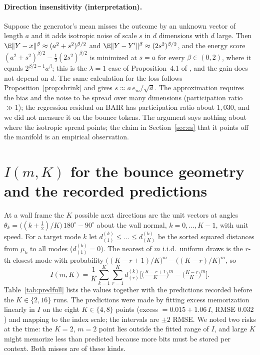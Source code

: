 \paragraph{Direction insensitivity (interpretation).}
Suppose the generator's mean misses the outcome by an unknown vector of length $a$ and it adds isotropic noise of scale $s$ in $d$ dimensions with $d$ large. Then $\E\|Y - x\|^\beta \approx (a^2 + s^2)^{\beta/2}$ and $\E\|Y - Y'\|^\beta \approx (2 s^2)^{\beta/2}$, and the energy score $(a^2 + s^2)^{\beta/2} - \frac{1}{2}(2s^2)^{\beta/2}$ is minimized at $s = a$ for every $\beta \in (0, 2)$, where it equals $2^{\beta/2 - 1} a^\beta$; this is the $\lambda = 1$ case of Proposition~4.1 of \citet{debortoli2025distributional}, and the gain does not depend on $d$. The same calculation for the \nom{} loss follows Proposition~\ref{prop:shrink} and gives $s \approx a\, e_m/\sqrt{d}$. The approximation requires the bias and the noise to be spread over many dimensions (participation ratio $\gg 1$); the regression residual on BAIR has participation ratio about $1{,}030$, and we did not measure it on the bounce tokens. The argument says nothing about where the isotropic spread points; the claim in Section~\ref{sec:es} that it points off the manifold is an empirical observation.

\section{$I(m,K)$ for the bounce geometry and the recorded predictions}
\label{app:pred}
\label{app:imk}
At a wall frame the $K$ possible next directions are the unit vectors at angles $\theta_k = \big((k + \tfrac12)/K\big)\,180^\circ - 90^\circ$ about the wall normal, $k = 0, \dots, K-1$, with unit speed. For a target mode $k$ let $d^{(k)}_{(1)} \le \dots \le d^{(k)}_{(K)}$ be the sorted squared distances from $\mu_k$ to all modes ($d^{(k)}_{(1)} = 0$). The nearest of $m$ i.i.d.\ uniform draws is the $r$-th closest mode with probability $\big((K - r + 1)/K\big)^m - \big((K - r)/K\big)^m$, so
\begin{equation}
I(m, K) = \frac{1}{K} \sum_{k=1}^{K} \sum_{r=1}^{K} d^{(k)}_{(r)} \Big[ \big(\tfrac{K - r + 1}{K}\big)^m - \big(\tfrac{K - r}{K}\big)^m \Big].
\end{equation}
Table~\ref{tab:predfull} lists the values together with the predictions recorded before the $K \in \{2, 16\}$ runs. The predictions were made by fitting excess memorization linearly in $I$ on the eight $K \in \{4, 8\}$ points (excess $= 0.015 + 1.06\,I$, RMSE $0.032$) and mapping to the index scale; the intervals are $\pm 2$ RMSE. We noted two risks at the time: the $K{=}2$, $m{=}2$ point lies outside the fitted range of $I$, and large $K$ might memorize less than predicted because more bits must be stored per context. Both misses are of these kinds.

